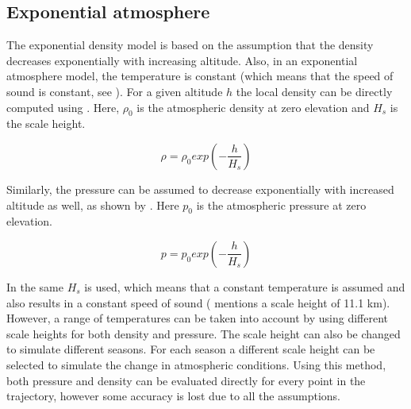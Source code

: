 \subsection{Exponential atmosphere}
\label{subsec:expatm}
The exponential density model is based on the assumption that the density decreases exponentially with increasing altitude. Also, in an exponential atmosphere model, the temperature is constant (which means that the speed of sound is constant, see ). For a given altitude $h$ the local density can be directly computed using  \cite{fanning1996model}. Here, $\rho_{0}$ is the atmospheric density at zero elevation and $H_{s}$ is the scale height.


\begin{equation} \label{eq:expdensity}
\rho=\rho_{0}exp\left(-\dfrac{h}{H_{s}}\right)
\end{equation}

Similarly, the pressure can be assumed to decrease exponentially with increased altitude as well, as shown by . Here $p_{0}$ is the atmospheric pressure at zero elevation.


\begin{equation} \label{eq:exppressure}
p=p_{0}exp\left(-\dfrac{h}{H_{s}}\right)
\end{equation}

In   the same $H_{s}$ is used, which means that a constant temperature is assumed and also results in a constant speed of sound (\cite{williams2015} mentions a scale height of 11.1 km). However, a range of temperatures can be taken into account by using different scale heights for both density and pressure. The scale height can also be changed to simulate different seasons. For each season a different scale height can be selected to simulate the change in atmospheric conditions. Using this method, both pressure and density can be evaluated directly for every point in the trajectory, however some accuracy is lost due to all the assumptions.\\


